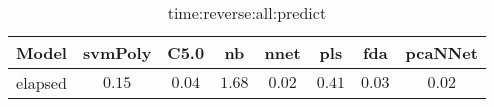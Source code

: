 \begin{table}[!ht]
	\centering
	\begin{tabular}{|c|c|c|c|c|c|c|c|}
		\hline
		Model & svmPoly & C5.0 & nb & nnet & pls & fda & pcaNNet \\ \hline
		elapsed & $0.15$ & $0.04$ & $1.68$ & $0.02$ & $0.41$ & $0.03$ & $0.02$ \\ \hline
	\end{tabular}
	\caption{time:reverse:all:predict}
	\label{tab:time:reverse:all:predict}
\end{table}

